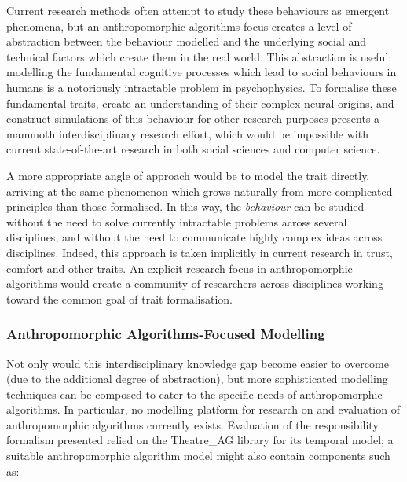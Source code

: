 Current research methods often attempt to study these behaviours as emergent phenomena, but an anthropomorphic algorithms focus creates a level of abstraction between the behaviour modelled and the underlying social and technical factors which create them in the real world. This abstraction is useful: modelling the fundamental cognitive processes which lead to social behaviours in humans is a notoriously intractable problem in psychophysics. To formalise these fundamental traits, create an understanding of their complex neural origins, and construct simulations of this behaviour for other research purposes presents a mammoth interdisciplinary research effort, which would be impossible with current state-of-the-art research in both social sciences and computer science.\par

A more appropriate angle of approach would be to model the trait directly, arriving at the same phenomenon which grows naturally from more complicated principles than those formalised. In this way, the \emph{behaviour} can be studied without the need to solve currently intractable problems across several disciplines, and without the need to communicate highly complex ideas across disciplines. Indeed, this approach is taken implicitly in current research in trust, comfort and other traits. An explicit research focus in anthropomorphic algorithms would create a community of researchers across disciplines working toward the common goal of trait formalisation.\par

\subsubsection{Anthropomorphic Algorithms-Focused Modelling}
Not only would this interdisciplinary knowledge gap become easier to overcome (due to the additional degree of abstraction), but more sophisticated modelling techniques can be composed to cater to the specific needs of anthropomorphic algorithms. In particular, no modelling platform for research on and evaluation of anthropomorphic algorithms currently exists. Evaluation of the responsibility formalism presented relied on the Theatre\_AG library for its temporal model; a suitable anthropomorphic algorithm model might also contain components such as:

